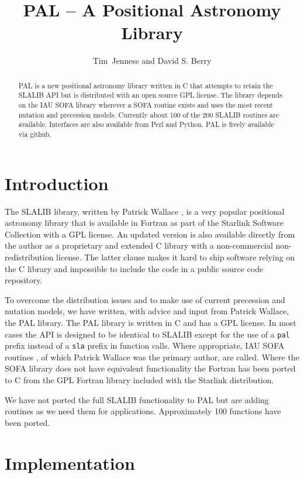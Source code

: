 \documentclass[11pt,twoside]{article}
\begin{document}
\title{PAL -- A Positional Astronomy Library}
\author{Tim~Jenness and David S. Berry
}

\begin{abstract}
  PAL is a new positional astronomy library written in C that attempts
  to retain the SLALIB API but is distributed with an open source GPL
  license. The library depends on the IAU SOFA library wherever a SOFA
  routine exists and uses the most recent nutation and precession
  models. Currently about 100 of the 200 SLALIB routines are
  available. Interfaces are also available from Perl and Python. PAL
  is freely available via github.
\end{abstract}

\section{Introduction}

The SLALIB library, written by Patrick Wallace
\citep{1994ASPC...61..481W}, is a very popular positional astronomy
library that is available in Fortran as part of the Starlink Software
Collection \citep[e.g.][]{2009ASPC..411..418J} with a GPL license. An
updated version is also available directly from the author as a
proprietary and extended C library with a non-commercial
non-redistribution license. The latter clause makes it hard to ship
software relying on the C library and impossible to include the code
in a public source code repository.

To overcome the distribution issues and to make use of current
precession and nutation models, we have written, with advice and input
from Patrick Wallace, the PAL library. The PAL library is written in C
and has a GPL license. In most cases the API is designed to be
identical to SLALIB except for the use of a \texttt{pal} prefix instead of a
\texttt{sla} prefix in function calls. Where appropriate, IAU SOFA routines
\citep{Hohenkerk:2010,1996ASPC..101..207W}, of which Patrick Wallace
was the primary author, are called. Where the SOFA library does not
have equivalent functionality the Fortran has been ported to C from
the GPL Fortran library included with the Starlink distribution.

We have not ported the full SLALIB functionality to PAL but are adding
routines as we need them for applications. Approximately 100 functions
have been ported.

\section{Implementation}
\end{document}
